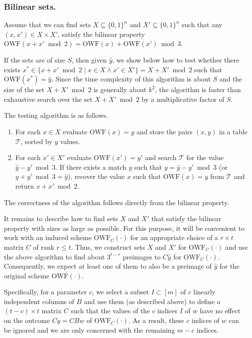 \documentclass[orivec,envcountsect]{llncs}
\newcommand{\OWF}{\text{OWF}}
\begin{document}
\subsubsection{Bilinear sets.}

Assume that we can find sets $X \subseteq \{0,1\}^n$ and $X' \subseteq \{0,1\}^n$ such that any $(x,x')\in X \times X'$, satisfy the bilinear property $\OWF(x + x' \bmod 2) = \OWF(x) + \OWF(x') \bmod 3$.

If the sets are of size $S$, then given $\hat{y}$, we show below how to test whether there exists $x^{*} \in \{x + x' \bmod 2 \mid x \in X \wedge x' \in X'\} = X + X' \bmod 2$ such that $\OWF(x^{*}) = \hat{y}$. Since the time complexity of this algorithm is about $S$ and the size of the set $X + X' \bmod 2$ is generally about $k^2$, the algorithm is faster than exhaustive search over the set $X + X' \bmod 2$ by a multiplicative factor of $S$.

The testing algorithm is as follows.
\begin{enumerate}
  \item For each $x \in X$ evaluate $\OWF(x) = y$ and store the pairs $(x,y)$ in a table $\mathcal{T}$, sorted by $y$ values.
  \item For each $x' \in X'$ evaluate $\OWF(x') = y'$ and search $\mathcal{T}$ for the value $\hat{y} - y' \bmod 3$. If there exists a match $y$ such that $y = \hat{y} - y' \bmod 3$ (or $y + y' \bmod 3 = \hat{y}$), recover the value $x$ such that $\OWF(x) = y$ from $\mathcal{T}$ and return $x + x' \bmod 2$.
\end{enumerate}
The correctness of the algorithm follows directly from the bilinear property.

It remains to describe how to find sets $X$ and $X'$ that satisfy the bilinear property with sizes as large as possible.
For this purpose, it will be convenient to work with an induced scheme $\OWF_C(\cdot)$ for an appropriate choice of a $r \times t$ matrix $C$ of rank $r \leq t$.
Thus, we construct sets $X$ and $X'$ for $\OWF_C(\cdot)$ and use the above algorithm to find
about $3^{t - r}$ preimages to $C \hat{y}$ for $\OWF_C(\cdot)$. Consequently, we expect at least one of them to also be a preimage of $\hat{y}$ for the original scheme $\OWF(\cdot)$.

Specifically, for a parameter $c$, we select a subset $I \subset [m]$ of $c$ linearly independent columns of $B$ and use them (as described above) to define a $(t-c) \times t$ matrix $C$ such that the values of the $c$ indices $I$ of $w$ have no effect on the outcome $Cy = CBw$ of $\OWF_C(\cdot)$. As a result, these $c$ indices of $w$ can be ignored and we are only concerned with the remaining $m - c$ indices.
\end{document}
